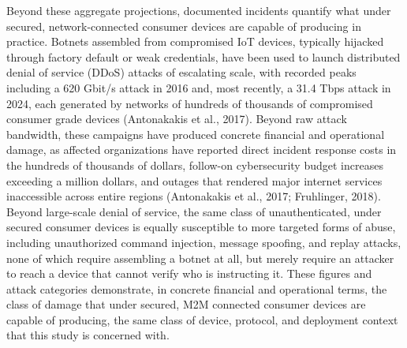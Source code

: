 Beyond these aggregate projections, documented incidents quantify what under secured, network-connected consumer devices are capable of producing in practice. Botnets assembled from compromised IoT devices, typically hijacked through factory default or weak credentials, have been used to launch distributed denial of service (DDoS) attacks of escalating scale, with recorded peaks including a 620 Gbit/s attack in 2016 and, most recently, a 31.4 Tbps attack in 2024, each generated by networks of hundreds of thousands of compromised consumer grade devices (Antonakakis et al., 2017). Beyond raw attack bandwidth, these campaigns have produced concrete financial and operational damage, as affected organizations have reported direct incident response costs in the hundreds of thousands of dollars, follow-on cybersecurity budget increases exceeding a million dollars, and outages that rendered major internet services inaccessible across entire regions (Antonakakis et al., 2017; Fruhlinger, 2018). Beyond large-scale denial of service, the same class of unauthenticated, under secured consumer devices is equally susceptible to more targeted forms of abuse, including unauthorized command injection, message spoofing, and replay attacks, none of which require assembling a botnet at all, but merely require an attacker to reach a device that cannot verify who is instructing it. These figures and attack categories demonstrate, in concrete financial and operational terms, the class of damage that under secured, M2M connected consumer devices are capable of producing, the same class of device, protocol, and deployment context that this study is concerned with.
